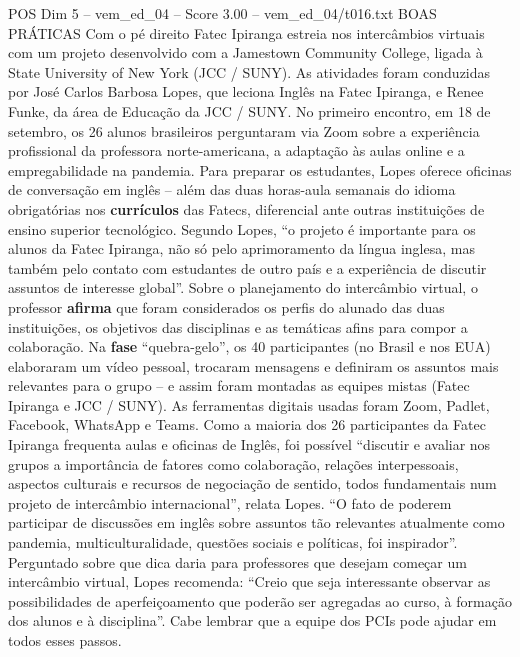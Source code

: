 \begin{textsample}{POS Dim 5 – vem\_ed\_04 – Score 3.00 – vem\_ed\_04/t016.txt}  \label{ex:f5_pos_144}
BOAS PRÁTICAS Com o pé direito Fatec Ipiranga estreia nos intercâmbios virtuais com um projeto desenvolvido com a Jamestown Community College, ligada à State University of New York (JCC / SUNY).
As atividades foram conduzidas por José Carlos Barbosa Lopes, que leciona Inglês na Fatec Ipiranga, e Renee Funke, da área de Educação da JCC / SUNY.
No primeiro encontro, em 18 de setembro, os 26 alunos brasileiros perguntaram via Zoom sobre a experiência profissional da professora norte-americana, a adaptação às aulas online e a empregabilidade na pandemia.
Para preparar os estudantes, Lopes oferece oficinas de conversação em inglês – além das duas horas-aula semanais do idioma obrigatórias nos \textbf{currículos} das Fatecs, diferencial ante outras instituições de ensino superior tecnológico.
Segundo Lopes, “o projeto é importante para os alunos da Fatec Ipiranga, não só pelo aprimoramento da língua inglesa, mas também pelo contato com estudantes de outro país e a experiência de discutir assuntos de interesse global”.
Sobre o planejamento do intercâmbio virtual, o professor \textbf{afirma} que foram considerados os perfis do alunado das duas instituições, os objetivos das disciplinas e as temáticas afins para compor a colaboração.
Na \textbf{fase} “quebra-gelo”, os 40 participantes (no Brasil e nos EUA) elaboraram um vídeo pessoal, trocaram mensagens e definiram os assuntos mais relevantes para o grupo – e assim foram montadas as equipes mistas (Fatec Ipiranga e JCC / SUNY).
As ferramentas digitais usadas foram Zoom, Padlet, Facebook, WhatsApp e Teams.
Como a maioria dos 26 participantes da Fatec Ipiranga frequenta aulas e oficinas de Inglês, foi possível “discutir e avaliar nos grupos a importância de fatores como colaboração, relações interpessoais, aspectos culturais e recursos de negociação de sentido, todos fundamentais num projeto de intercâmbio internacional”, relata Lopes. “O fato de poderem participar de discussões em inglês sobre assuntos tão relevantes atualmente como pandemia, multiculturalidade, questões sociais e políticas, foi inspirador”.
Perguntado sobre que dica daria para professores que desejam começar um intercâmbio virtual, Lopes recomenda: “Creio que seja interessante observar as possibilidades de aperfeiçoamento que poderão ser agregadas ao curso, à formação dos alunos e à disciplina”.
Cabe lembrar que a equipe dos PCIs pode ajudar em todos esses passos.

\end{textsample}
